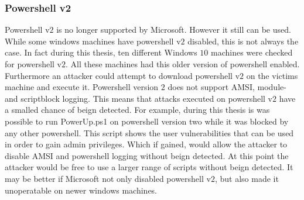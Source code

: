 \documentclass{article}%
\begin{document}
\subsubsection{Powershell v2}
Powershell v$2$ is no longer supported by Microsoft. However it still can be used. While some windows machines have powershell v$2$ disabled, this is not always the case. In fact during this thesis, ten different Windows $10$ machines were checked for powershell v$2$. All these machines had this older version of powershell enabled. Furthermore an attacker could attempt to download powershell v$2$ on the victims machine and execute it. Powershell version $2$ does not support AMSI, module- and scriptblock logging. This means that attacks executed on powershell v$2$ have a smalled chance of beign detected. For example, during this thesis is was possible to run PowerUp.ps1 on powershell version two while it was blocked by any other powershell. This script shows the user vulnerabilities that can be used in order to gain admin privileges. Which if gained, would allow the attacker to disable AMSI and powershell logging without beign detected. At this point the attacker would be free to use a larger range of scripts without beign detected. It may be better if Microsoft not only disabled powershell v$2$, but also made it unoperatable on newer windows machines. 
\end{document}
